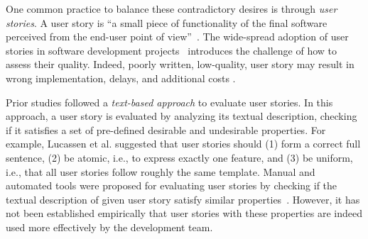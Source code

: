 One common practice to balance these contradictory desires is through \emph{user stories}. A user story is ``a small piece of functionality of the final software perceived from the end-user point of view''~\cite{rees2002feasible}. 
The wide-spread adoption of user stories in software development projects~\cite{kassab2015changing,wang2014role,dimitrijevic2015comparative,lucassen2016use} introduces the challenge of how to assess their quality. Indeed, poorly written, low-quality, user story may result in wrong implementation, delays, and additional costs \cite{wang2014role}.

Prior studies followed a \emph{text-based approach} to evaluate user stories. 
In this approach, a user story is evaluated by analyzing its textual description, checking if it satisfies a set of pre-defined desirable and undesirable properties. 
For example, Lucassen et al. \cite{lucassen2015forging} suggested that user stories should (1) form a correct full sentence, (2) be atomic, i.e., to express exactly one feature, and (3) be uniform, i.e., that all user stories follow roughly the same template. 
Manual and automated tools were proposed for evaluating user stories by checking if the textual description of given user story satisfy similar properties~\cite{leffingwell2010agileINVEST,lai2017user}. 
However, it has not been established empirically that user stories with these properties are indeed used more effectively by the development team. 


